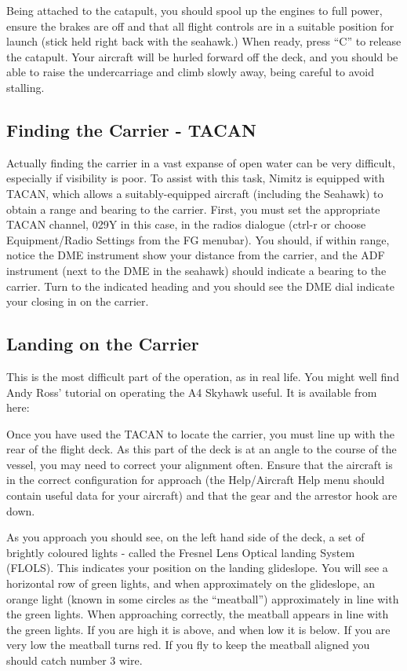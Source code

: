 \begin{enumerate}
Being attached to the catapult, you should spool up the engines to full power, ensure the brakes are off
and that all flight controls are in a suitable position for launch (stick held right back with the seahawk.)
When ready, press ``C'' to release the catapult. Your aircraft will be hurled forward off the deck, and
you should be able to raise the undercarriage and climb slowly away, being careful to avoid stalling.

\subsection{Finding the Carrier - TACAN}

Actually finding the carrier in a vast expanse of open water can be very difficult, especially if visibility
is poor. To assist with this task, Nimitz is equipped with TACAN, which allows a suitably-equipped
aircraft (including the Seahawk) to obtain a range and bearing to the carrier. First, you must set
the appropriate TACAN channel, 029Y in this case, in the radios dialogue (ctrl-r or choose
Equipment/Radio Settings from the FG menubar). You should, if within range, notice the DME instrument
show your distance from the carrier, and the ADF instrument (next to the DME in the seahawk) should
indicate a bearing to the carrier. Turn to the indicated heading and you should see the DME dial
indicate your closing in on the carrier.

\subsection{Landing on the Carrier}

This is the most difficult part of the operation, as in real life. You might well find Andy Ross' tutorial on
operating the A4 Skyhawk useful. It is available from here:

\noindent
{}

Once you have used the TACAN to locate the carrier, you must
line up with the rear of the flight deck. As this part of the deck is at an angle to the course of the vessel,
you may need to correct your alignment often. Ensure that the aircraft is in the correct configuration for
approach (the Help/Aircraft Help menu should contain useful data for your aircraft) and that the gear and
the arrestor hook are down.

As you approach you should see, on the left hand side of the deck, a set of brightly coloured lights - called
the Fresnel Lens Optical landing System (FLOLS). This indicates your position on the landing glideslope.
You will see a horizontal row of green lights, and when approximately on the glideslope, an orange light
(known in some circles as the ``meatball'') approximately in line with the green lights. When approaching
correctly, the meatball appears in line with the green lights. If you are high it is above, and when low
it is below. If you are very low the meatball turns red. If you fly to keep the meatball aligned you
should catch number 3 wire.


\end{enumerate}
